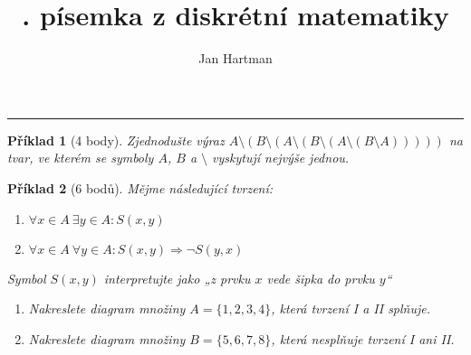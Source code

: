 \documentclass[10pt]{article}
\title{\tutnum. písemka z diskrétní matematiky}
\author{Jan Hartman}
\newcommand{\titlerule}{%
    \noindent %
    \makebox[\textwidth]{\large \thetitle \hfill Jméno: \hspace{4cm}}
    \rule{\textwidth}{0.4pt}%
}
\theoremstyle{definitionstyle}
\theoremstyle{problemstyle}
\newtheorem{problem}{Příklad}
\begin{document}
\titlerule

\begin{problem}[4 body]
Zjednodušte výraz $A \setminus ( B \setminus ( A \setminus ( B \setminus ( A \setminus ( B \setminus A )))))$ na tvar, ve kterém se symboly $A$, $B$ a $\setminus$ vyskytují nejvýše jednou.
\end{problem}

\begin{problem}[6 bodů]
Mějme následující tvrzení:
\begin{enumerate}[label=\Roman*.]
    \item $\forall x \in A \ \exists y \in A : S(x,y)$
    \item $\forall x \in A \ \forall y \in A : S(x,y) \Rightarrow \neg S(y,x)$
\end{enumerate}
Symbol $S(x,y)$ interpretujte jako \textit{„z prvku $x$ vede šipka do prvku $y$“}
\begin{enumerate}[label=(\alph*)]
    \item Nakreslete diagram množiny $A=\{1,2,3,4\}$, která tvrzení I a II splňuje.
    \item Nakreslete diagram množiny $B=\{5,6,7,8\}$, která nesplňuje tvrzení I ani II.
\end{enumerate}

\end{problem}
\end{document}
